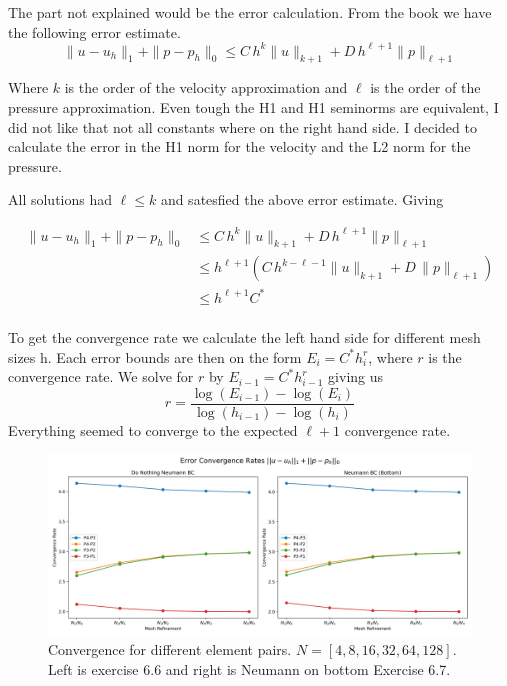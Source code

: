\documentclass[a4paper,12pt]{article}
\theoremstyle{exerciseStyle}
\theoremstyle{solutionStyle}
\begin{document}
\begin{solution}{6.7}
    The part not explained would be the error calculation.
    From the book we have the following error estimate.
    \[
        \|u - u_h\|_1 + \|p - p_h\|_0 \le C\,h^k \|u\|_{k+1} + D\,h^{\ell+1} \|p\|_{\ell+1}
    \]

    Where \(k\) is the order of the velocity approximation and \(\ell\) is the order of the pressure approximation.
    Even tough the H1 and H1 seminorms are equivalent, I did not like that not all constants
    where on the right hand side. I decided to calculate the error in the H1 norm for the velocity and the L2 norm for the pressure.

    All solutions had \( \ell \le k\) and satesfied the above error estimate. Giving

    \begin{align*}
        \|u - u_h\|_1 + \|p - p_h\|_0 & \le C\,h^k \|u\|_{k+1} + D\,h^{\ell+1} \|p\|_{\ell+1}                               \\
                                      & \le h^{\ell+1} \left(  C\,h^{k - \ell - 1} \|u\|_{k+1} + D\, \|p\|_{\ell+1} \right) \\
                                      & \le h^{\ell+1}  C^*                                                                 \\
    \end{align*}

    To get the convergence rate we calculate the left hand side for different mesh sizes h.
    Each error bounds are then on the form \(E_i = C^* h_i^r\), where \(r\) is the convergence rate.
    We solve for \(r\) by \(E_{i-1} = C^* h_{i-1}^r\) giving us
    \[
        r = \frac{\log(E_{i-1}) - \log(E_i)}{\log(h_{i-1}) - \log(h_i)}
    \]
    Everything seemed to converge to the expected \(\ell + 1\) convergence rate.
\end{solution}

\begin{figure}[h]
    \centering
    \centering
    \includegraphics[width=1\linewidth]{figs/convergence_rates_subplot.png}
    \caption{Convergence for different element pairs. \( N = [4, 8, 16, 32, 64, 128] \). Left is exercise 6.6 and right is Neumann on bottom Exercise 6.7.}
    \label{fig:ex66}
\end{figure}
\end{document}

